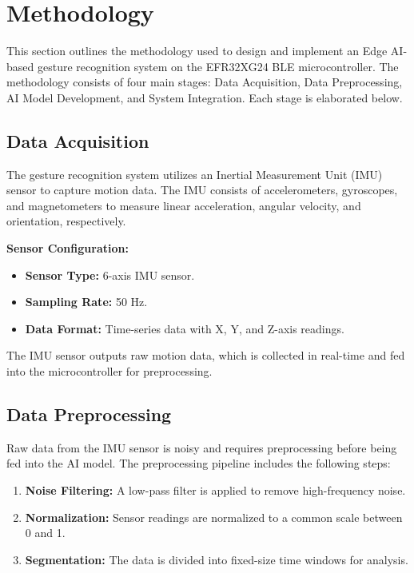 \documentclass[
  9pt,
  letterpaper,
  abstract,
  titlepage]{scrbook}
\begin{document}
\section{Methodology}\label{sec:methodology}

This section outlines the methodology used to design and implement an
Edge AI-based gesture recognition system on the EFR32XG24 BLE
microcontroller. The methodology consists of four main stages: Data
Acquisition, Data Preprocessing, AI Model Development, and System
Integration. Each stage is elaborated below.

\subsection{Data Acquisition}\label{data-acquisition}

The gesture recognition system utilizes an Inertial Measurement Unit
(IMU) sensor to capture motion data. The IMU consists of accelerometers,
gyroscopes, and magnetometers to measure linear acceleration, angular
velocity, and orientation, respectively.

\textbf{Sensor Configuration:}

\begin{itemize}
\item
  \textbf{Sensor Type:} 6-axis IMU sensor.
\item
  \textbf{Sampling Rate:} 50 Hz.
\item
  \textbf{Data Format:} Time-series data with X, Y, and Z-axis readings.
\end{itemize}

The IMU sensor outputs raw motion data, which is collected in real-time
and fed into the microcontroller for preprocessing.

\subsection{Data Preprocessing}\label{data-preprocessing}

Raw data from the IMU sensor is noisy and requires preprocessing before
being fed into the AI model. The preprocessing pipeline includes the
following steps:

\begin{enumerate}
\def\labelenumi{\arabic{enumi}.}
\item
  \textbf{Noise Filtering:} A low-pass filter is applied to remove
  high-frequency noise.
\item
  \textbf{Normalization:} Sensor readings are normalized to a common
  scale between 0 and 1.
\item
  \textbf{Segmentation:} The data is divided into fixed-size time
  windows for analysis.
\end{enumerate}
\end{document}
